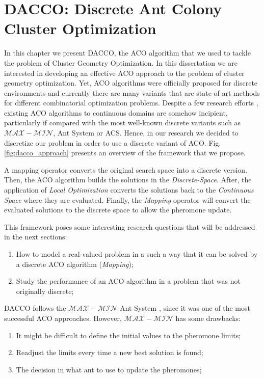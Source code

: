 \chapter{DACCO: Discrete Ant Colony Cluster Optimization}
\label{chap:dacco}

In this chapter we present DACCO, the ACO algorithm that we used to tackle the problem of Cluster Geometry Optimization. In this dissertation we are interested in developing an effective ACO approach to the problem of cluster geometry optimization. Yet, ACO algorithms were officially proposed for discrete environments and currently there are many variants that are state-of-art methods for different combinatorial optimization problems. Despite a few research efforts \cite{bilchev95, kong06, socha04, tsutsui04}, existing ACO algorithms to continuous domains are somehow incipient, particularly if compared with the most well-known discrete variants such as $\mathcal{MAX}-\mathcal{MIN}$, Ant System or ACS. Hence, in our research we decided to discretize our problem in order to use a discrete variant of ACO. Fig. \ref{fig:dacco_approach} presents an overview of the framework that we propose.  

A mapping operator converts the original search space into a discrete version. Then, the ACO algorithm builds the solutions in the \emph{Discrete-Space}. After, the application of \emph{Local Optimization} converts the solutions back to the \emph{Continuous Space} where they are evaluated. Finally, the \emph{Mapping} operator will convert the evaluated solutions to the discrete space to allow the pheromone update.

This framework poses some interesting research questions that will be addressed in the next sections:
\begin{enumerate}
	\item How to model a real-valued problem in a such a way that it can be solved by a discrete ACO algorithm (\emph{Mapping});
	\item Study the performance of an ACO algorithm in a problem that was not originally discrete;
\end{enumerate}

DACCO follows the $\mathcal{MAX}-\mathcal{MIN}$ Ant System \cite{stutzle00}, since it was one of the most successful ACO approaches. However, $\mathcal{MAX}-\mathcal{MIN}$ has some drawbacks:
\begin{enumerate}
	\item It might be difficult to define the initial values to the pheromone limits;
	\item Readjust the limits every time a new best solution is found; 
	\item The decision in what ant to use to update the pheromones;
\end{enumerate}

